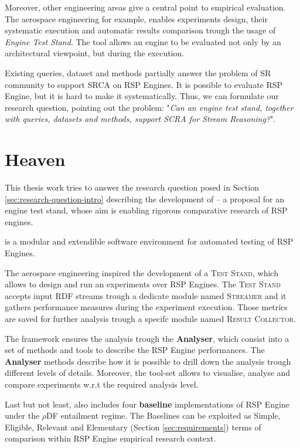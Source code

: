 Moreover, other engineering areas give a central point to empirical evaluation. The aerospace engineering for example, enables experiments design, their systematic execution and automatic results comparison trough the usage of \textit{Engine Test Stand}. The tool allows an engine to be evaluated not only by an architectural viewpoint, but during the execution.

Existing queries, dataset and methods partially answer the problem of SR community to support SRCA on RSP Engines. It is possible to evaluate RSP Engine, but it is hard to make it systematically. Thus, we can formulate our research question, pointing out the problem: "\textit{Can an engine test stand, together with queries, datasets and methods, support SCRA for Stream Reasoning?}".

\section{Heaven}\label{sec:heaven-intro}

This thesis work tries to answer the research question posed in Section \ref{sec:research-question-intro} describing the development of \name -- a proposal for an engine test stand,  whose aim is enabling rigorous comparative research of RSP engines. 

\name is a modular and extendible software environment for automated testing of RSP Engines. 

The aerospace engineering inspired the development of a \textsc{Test Stand}, which allows to design and run an experiments over RSP Engines. The \textsc{Test Stand} accepts input RDF streams trough a dedicate module named \textsc{Streamer} and it gathers performance measures during the experiment execution. Those metrics are saved for further analysis trough a specifc module named \textsc{Result Collector}.

The framework ensures the analysis trough the \textbf{Analyser}, which consist into a set of methods and tools to describe the RSP Engine performances. The \textbf{Analyser} methods describe how it is possible to drill down the analysis trough different levels of details. Moreover, the tool-set allows to visualise, analyse and compare experiments w.r.t the required analysis level. 

Last but not least, \name also includes four \textbf{baseline} implementations of RSP Engine under the $\rho$DF \cite{DBLP:conf/esws/MunozPG07} entailment regime. The Baselines can be exploited  as Simple, Eligible, Relevant and Elementary (Section \ref{sec:requirements}) terms of comparison within RSP Engine empirical research context.  


